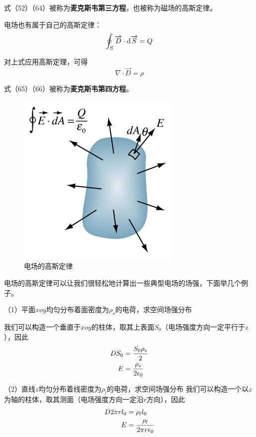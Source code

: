 \documentclass[UTF8,a4paper,11pt]{article}
\begin{document}
式（52）（64）被称为\textbf{麦克斯韦第三方程}，也被称为磁场的高斯定律。

电场也有属于自己的高斯定律：
\begin{equation}
\oint_S\overrightarrow{D}\cdot{\rm d}\overrightarrow{S}=Q
\end{equation}

对上式应用高斯定理，可得
\begin{equation}
\nabla\cdot\overrightarrow{D}=\rho
\end{equation}

式（65）（66）被称为\textbf{麦克斯韦第四方程}。
\begin{figure}[htbp]
\centering
\includegraphics[scale=2]{p9.png}
\caption{电场的高斯定律}
\end{figure}

电场的高斯定律可以让我们很轻松地计算出一些典型电场的场强，下面举几个例子。

（1）平面$xoy$均匀分布着面密度为$\rho_s$的电荷，求空间场强分布

我们可以构造一个垂直于$xoy$的柱体，取其上表面$S_0$（电场强度方向一定平行于$z$），因此
\begin{equation}
\begin{aligned}
DS_0&=\frac{S_0\rho_s}{2}\\
E&=\frac{\rho_s}{2\epsilon_0}
\notag
\end{aligned}
\end{equation}

（2）直线$z$均匀分布着线密度为$\rho_l$的电荷，求空间场强分布
我们可以构造一个以$z$为轴的柱体，取其测面（电场强度方向一定沿$r$方向），因此
\begin{equation}
\begin{aligned}
D2\pi rl_0&=\rho_ll_0\\
E&=\frac{\rho_l}{2\pi r\epsilon_0}
\notag
\end{aligned}
\end{equation}
\end{document}
